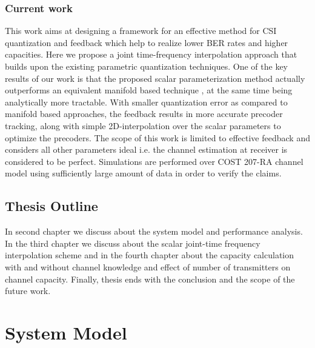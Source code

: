 \documentclass[11pt,a4paper]{report}
\begin{document}
\subsection{Current work}
This work aims at designing a framework for an effective method for CSI quantization
and feedback which help to realize lower BER rates and higher capacities.  
Here we propose a joint time-frequency interpolation approach that builds 
upon the existing parametric quantization techniques. One of the key results of 
our work is that the proposed scalar parameterization method actually outperforms 
an equivalent manifold based technique \cite{Gupt1905:Predictive}, at the same 
time being analytically more tractable. With smaller quantization error as compared 
to manifold based approaches, the feedback results in more accurate precoder tracking, 
along with simple 2D-interpolation over the scalar parameters to optimize the precoders.
The scope of this work is limited to effective feedback and considers all other parameters
ideal i.e. the channel estimation at receiver is considered to be perfect.
Simulations are performed over COST 207-RA channel model using sufficiently 
large amount of data in order to verify the claims.


\section{Thesis Outline}
In second chapter we discuss about the system model and performance analysis. 
In the third chapter we discuss about the scalar joint-time frequency interpolation
scheme and in the fourth chapter about the capacity calculation with and 
without channel knowledge and effect of number of transmitters on channel capacity.
Finally, thesis ends with the conclusion and the scope of the future work.



\chapter{System Model}
\label{chap:sysMod}
\end{document}
